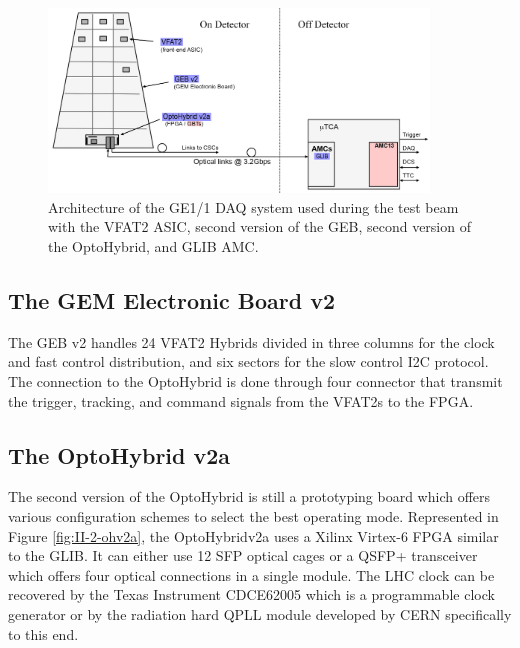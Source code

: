     \begin{figure}[h!]
      \centering
      \includegraphics[width=0.9\textwidth]{img/II-2-daq/gem-system-v2a.pdf}
      \caption{Architecture of the GE1/1 DAQ system used during the test beam with the VFAT2 ASIC, second version of the GEB, second version of the OptoHybrid, and GLIB AMC.}
      \label{fig:II-2-gem-system-v2a}
    \end{figure}

    \subsection{The GEM Electronic Board v2}

      The GEB v2 handles 24 VFAT2 Hybrids divided in three columns for the clock and fast control distribution, and six sectors for the slow control I2C protocol. The connection to the OptoHybrid is done through four connector that transmit the trigger, tracking, and command signals from the VFAT2s to the FPGA.

    \subsection{The OptoHybrid v2a}

      The second version of the OptoHybrid is still a prototyping board which offers various configuration schemes to select the best operating mode. Represented in Figure \ref{fig:II-2-ohv2a}, the OptoHybridv2a uses a Xilinx Virtex-6 FPGA similar to the GLIB. It can either use 12 SFP optical cages or a QSFP+ transceiver which offers four optical connections in a single module. The LHC clock can be recovered by the Texas Instrument CDCE62005 which is a programmable clock generator or by the radiation hard QPLL module developed by CERN specifically to this end.

